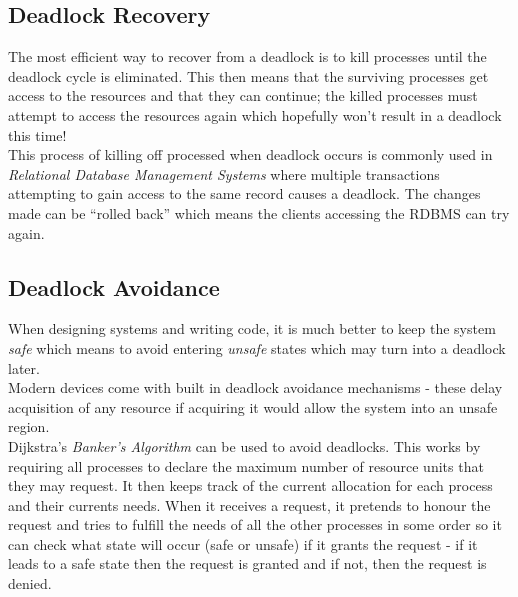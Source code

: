 \subsection{Deadlock Recovery}
The most efficient way to recover from a deadlock is to kill processes until the deadlock cycle is eliminated. This then means that the surviving processes get access to the resources and that they can continue; the killed processes must attempt to access the resources again which hopefully won't result in a deadlock this time!\\

This process of killing off processed when deadlock occurs is commonly used in \textit{Relational Database Management Systems} where multiple transactions attempting to gain access to the same record causes a deadlock. The changes made can be ``rolled back'' which means the clients accessing the RDBMS can try again. 

\subsection{Deadlock Avoidance}
When designing systems and writing code, it is much better to keep the system \textit{safe} which means to avoid entering \textit{unsafe} states which may turn into a deadlock later.\\

Modern devices come with built in deadlock avoidance mechanisms - these delay acquisition of any resource if acquiring it would allow the system into an unsafe region.\\

Dijkstra's \textit{Banker's Algorithm} can be used to avoid deadlocks. This works by requiring all processes to declare the maximum number of resource units that they may request. It then keeps track of the current allocation for each process and their currents needs. When it receives a request, it pretends to honour the request and tries to fulfill the needs of all the other processes in some order so it can check what state will occur (safe or unsafe) if it grants the request - if it leads to a safe state then the request is granted and if not, then the request is denied. 
